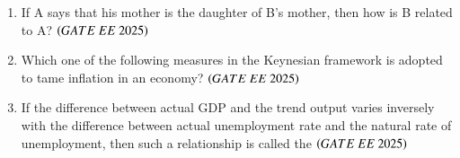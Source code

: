 \documentclass[journal,12pt,onecolumn]{IEEEtran}
\theoremstyle{remark}
\begin{document}
\begin{enumerate}
   \item If A says that his mother is the daughter of B's mother, then how is B related to A?      
    \hfill $\brak{GATE\ EE\ 2025}$
    \begin{enumerate}
       \end{enumerate}

    \item Which one of the following measures in the Keynesian framework is adopted to tame inflation in an economy?  
    \hfill $\brak{GATE\ EE\ 2025}$

    \begin{enumerate}
      \end{enumerate}

    \item If the difference between actual GDP and the trend output varies inversely with the difference between actual unemployment rate and the natural rate of unemployment, then such a relationship is called the       \hfill $\brak{GATE\ EE\ 2025}$
    \begin{enumerate}
      \end{enumerate}


\end{enumerate}
\end{document}
